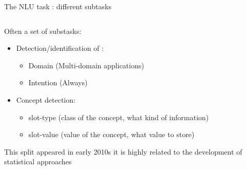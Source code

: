 \documentclass[10pt,aspectratio=169]{beamer}
\begin{document}
\begin{frame}{The NLU task : different subtasks}
\begin{columns}
\begin{column}{0.5\textwidth}
\begin{block}{Often a set of substasks: }
            \begin{itemize}
                \item Detection/identification of :
                    \begin{itemize}
                        \item Domain (Multi-domain applications)
                        \item Intention (Always)
                    \end{itemize}
                \item Concept detection:
                    \begin{itemize}
                        \item slot-type (class of the concept, what kind of information)
                        \item slot-value (value of the concept, what value to store)
                    \end{itemize}
            \end{itemize}
            This split appeared in early 2010s \cite{mori-2011-spoken} it is highly related to the development of statistical approaches
            
            \end{block}
        \end{column}
    \end{columns}
\end{frame}
\end{document}
